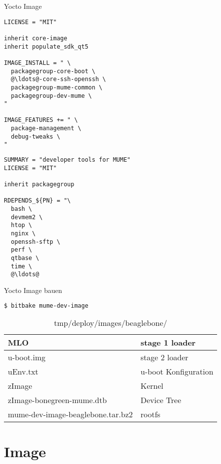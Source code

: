 
\begin{frame}[fragile]{Yocto Image}
	\begin{multicols}{2}
		\begin{lstlisting}[title=mume-dev-image.bb,frame=single,language=bitbake]
LICENSE = "MIT"

inherit core-image
inherit populate_sdk_qt5

IMAGE_INSTALL = " \
  packagegroup-core-boot \
  @\ldots@-core-ssh-openssh \
  packagegroup-mume-common \
  packagegroup-dev-mume \
"

IMAGE_FEATURES += " \
  package-management \
  debug-tweaks \
"
		\end{lstlisting}
		\pause
		\begin{lstlisting}[title=packagegroup-dev-mume.bb, frame=single, numbers=right, language=bitbake]
SUMMARY = "developer tools for MUME"
LICENSE = "MIT"

inherit packagegroup

RDEPENDS_${PN} = "\
  bash \
  devmem2 \
  htop \
  nginx \
  openssh-sftp \
  perf \
  qtbase \
  time \
  @\ldots@
		\end{lstlisting}
	\end{multicols}
\end{frame}

\begin{frame}[fragile]{Yocto Image bauen}
	\begin{lstlisting}[frame=single,language=bash, basicstyle=\small\ttfamily]
$ bitbake mume-dev-image
	\end{lstlisting}
	\pause
	\begin{table}
		\caption{tmp/deploy/images/beaglebone/}
		\begin{tabular}{ll}
			\hline MLO & stage 1 loader \\ 
			\hline u-boot.img & stage 2 loader \\ 
			\hline uEnv.txt & u-boot Konfiguration \\ 
			\hline zImage & Kernel \\ 
			\hline zImage-bonegreen-mume.dtb & Device Tree \\ 
			\hline mume-dev-image-beaglebone.tar.bz2 & rootfs \\ 
			\hline 
		\end{tabular} 
	\end{table}
\end{frame}

\section{Image}

